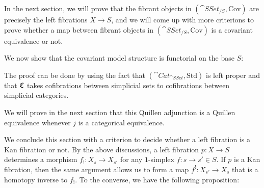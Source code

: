 In the next section, we will prove that the fibrant objects in $(\cat{SSet}_{/S},\text{Cov})$ are precisely the left fibrations
$X\to S$, and we will come up with more criterions to prove whether a map between fibrant objects in $(\cat{SSet}_{/S},\text{Cov})$
is a covariant equivalence or not.

We now show that the covariant model structure is functorial on the base $S$:


The proof can be done by using the fact that $(\cat{Cat}_{\cat{SSet}},\text{Std})$ is left proper and that
$\mathfrak{C}$ takes cofibrations between simplicial sets to cofibrations between simplicial categories.

We will prove in the next section that this Quillen adjunction is a Quillen equivalence whenever $j$ is a categorical equivalence.


We conclude this section with a criterion to decide whether a left fibration is a Kan fibration or not. By the above discussions,
a left fibration $p:X\to S$ determines a morphism $f_!:X_s\to X_{s'}$ for any $1$-simplex $f:s\to s'\in S$. If $p$ is a Kan fibration,
then the same argument allows us to form a map $f^!:X_{s'}\to X_{s}$ that is a homotopy inverse to $f_!$. To the converse, we have 
the following proposition:

